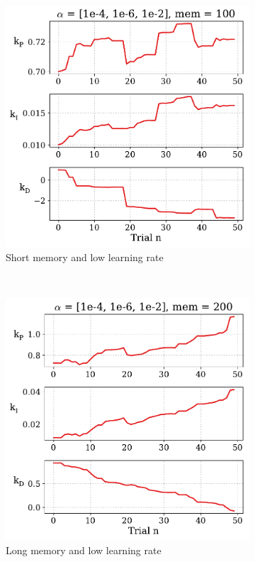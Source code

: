 \documentclass[conference]{IEEEtran}
\begin{document}
\begin{figure}[h]
\centering
\begin{subfigure}{.5\textwidth}
  \centering
  \includegraphics[width=0.7\linewidth]{figs/weight_05_07_t3.pdf}
  \caption{Short memory and low learning rate}
  \label{fig:note_jumps}
\end{subfigure} \\ \vspace{1cm}
\begin{subfigure}{.5\textwidth}
  \centering
  \includegraphics[width=.7\linewidth]{figs/weight_05_07_t5.pdf}
  \caption{Long memory and low learning rate}
\end{subfigure} \\ \vspace{1cm}
\begin{subfigure}{.5\textwidth}
  \centering

\end{subfigure}
\end{figure}
\end{document}
